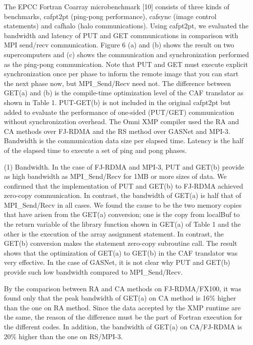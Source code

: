 The EPCC Fortran Coarray microbenchmark [10] consists of three kinds of benchmarks, cafpt2pt (ping-pong performance), cafsync (image control statements) and cafhalo (halo communications). Using cafpt2pt, we evaluated the bandwidth and latency of PUT and GET communications in comparison with MPI send/recv communication. Figure 6 (a) and (b) shows the result on two supercomputers and (c) shows the communication and synchronization performed as the ping-pong communication. Note that PUT and GET must execute explicit synchronization once per phase to inform the remote image that you can start the next phase now, but MPI\_Send/Recv need not. The difference between GET(a) and (b) is the compile-time optimization level of the CAF translator as shown in Table 1. PUT-GET(b) is not included in the original cafpt2pt but added to evaluate the performance of one-sided (PUT/GET) communication without synchronization overhead. The Omni XMP compiler used the RA and CA methods over FJ-RDMA and the RS method over GASNet and MPI-3. Bandwidth is the communication data size per elapsed time. Latency is the half of the elapsed time to execute a set of ping and pong phases.

(1) Bandwidth. In the case of FJ-RDMA and MPI-3, PUT and GET(b) provide as high bandwidth as MPI\_Send/Recv for 1MB or more sizes of data. We confirmed that the implementation of PUT and GET(b) to FJ-RDMA achieved zero-copy communication. In contrast, the bandwidth of GET(a) is half that of MPI\_Send/Recv in all cases. We found the cause to be the two memory copies that have arisen from the GET(a) conversion; one is the copy from localBuf to the return variable of the library function shown in GET(a) of Table 1 and the other is the execution of the array assignment statement. In contrast, the GET(b) conversion makes the statement zero-copy subroutine call. The result shows that the optimization of GET(a) to GET(b) in the CAF translator was very effective. In the case of GASNet, it is not clear why PUT and GET(b) provide such low bandwidth compared to MPI\_Send/Recv. 

By the comparison between RA and CA methods on FJ-RDMA/FX100, it was found only that the peak bandwidth of GET(a) on CA method is 16\% higher than the one on RA method. Since the data accepted by the XMP runtime are the same, the reason of the difference must be the part of Fortran execution for the different codes. In addition, the bandwidth of GET(a) on CA/FJ-RDMA is 20\% higher than the one on RS/MPI-3.

